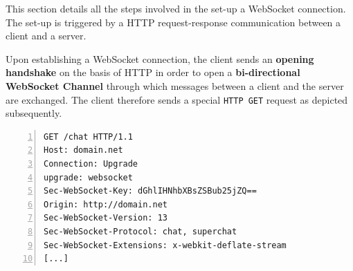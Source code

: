 \documentclass[a4paper, justified, notoc]{tufte-handout} %
\begin{document}
This section details all the steps involved in the set-up a WebSocket connection. The set-up is triggered by a HTTP request-response communication between a client and a server.

Upon establishing a WebSocket connection, the client sends an \textbf{opening handshake} on the basis of HTTP in order to open a \textbf{bi-directional WebSocket Channel} through which messages between a client and the server are exchanged. The client therefore sends a special \texttt{HTTP GET} request as depicted subsequently.

\newpage
\begin{Verbatim}[gobble=0,frame=lines,numbers=left]
GET /chat HTTP/1.1
Host: domain.net
Connection: Upgrade
upgrade: websocket
Sec-WebSocket-Key: dGhlIHNhbXBsZSBub25jZQ== 
Origin: http://domain.net
Sec-WebSocket-Version: 13
Sec-WebSocket-Protocol: chat, superchat 
Sec-WebSocket-Extensions: x-webkit-deflate-stream 
[...]
\end{Verbatim}

\end{document}
